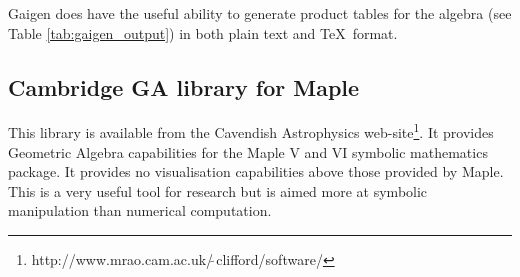 Gaigen does have the useful ability to generate product tables for the algebra
(see Table \ref{tab:gaigen_output}) in both plain text and \TeX\ format. 

\subsection{Cambridge GA library for Maple}
This library is available from the Cavendish Astrophysics
web-site\footnote{http://www.mrao.cam.ac.uk/$\tilde{\ }$clifford/software/}. It
provides Geometric Algebra capabilities for the Maple V and VI symbolic mathematics
package. It provides no visualisation capabilities above those provided by
Maple. This is a very useful tool for research but is aimed more at symbolic
manipulation than numerical computation.
